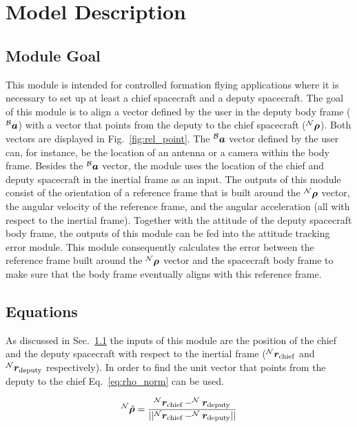 
\section{Model Description}

\subsection{Module Goal}\label{subsec:goal}

This module is intended for controlled formation flying applications where it is necessary to set up at least a chief spacecraft and a deputy spacecraft. The goal of this module is to align a vector defined by the user in the deputy body frame ($^{\cal B}{\bm a}$) with a vector that points from the deputy to the chief spacecraft ($^{\cal N}{\bm \rho}$). Both vectors are displayed in Fig.~\ref{fig:rel_point}. The $^{\cal B}{\bm a}$ vector defined by the user can, for instance, be the location of an antenna or a camera within the body frame. Besides the $^{\cal B}{\bm a}$ vector, the module uses the location of the chief and deputy spacecraft in the inertial frame as an input. The outputs of this module consist of the orientation of a reference frame that is built around the $^{\cal N}{\bm \rho}$ vector, the angular velocity of the reference frame, and the angular acceleration (all with respect to the inertial frame). Together with the attitude of the deputy spacecraft body frame, the outputs of this module can be fed into the attitude tracking error module. This module consequently calculates the error between the reference frame built around the $^{\cal N}{\bm \rho}$ vector and the spacecraft body frame to make sure that the body frame eventually aligns with this reference frame. 

\subsection{Equations}

As discussed in Sec.~\ref{subsec:goal} the inputs of this module are the position of the chief and the deputy spacecraft with respect to the inertial frame ($^{\cal N}{\bm r}_{\textrm{chief}}$ and $^{\cal N}{\bm r}_{\textrm{deputy}}$ respectively). In order to find the unit vector that points from the deputy to the chief Eq.~\eqref{eq:rho_norm} can be used.

\begin{equation}
    ^{\cal N}\hat{{\bm \rho}} = \frac{^{\cal N}{\bm r}_{\textrm{chief}} - ^{\cal N}{\bm r}_{\textrm{deputy}}}{||^{\cal N}{\bm r}_{\textrm{chief}} - ^{\cal N}{\bm r}_{\textrm{deputy}}||}
    \label{eq:rho_norm}
\end{equation}

